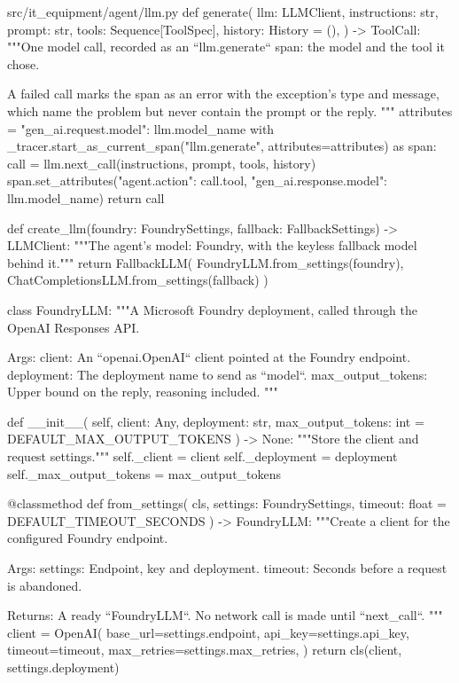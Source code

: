 \documentclass[11pt,letterpaper]{article}
\renewcommand{\_}{\textunderscore\allowbreak}
\begin{document}
\begin{codebox}{src/it_equipment/agent/llm.py}
def generate(
    llm: LLMClient,
    instructions: str,
    prompt: str,
    tools: Sequence[ToolSpec],
    history: History = (),
) -> ToolCall:
    """One model call, recorded as an ``llm.generate`` span: the model and the tool it chose.

    A failed call marks the span as an error with the exception's type and message, which
    name the problem but never contain the prompt or the reply.
    """
    attributes = {"gen_ai.request.model": llm.model_name}
    with _tracer.start_as_current_span("llm.generate", attributes=attributes) as span:
        call = llm.next_call(instructions, prompt, tools, history)
        span.set_attributes({"agent.action": call.tool, "gen_ai.response.model": llm.model_name})
        return call


def create_llm(foundry: FoundrySettings, fallback: FallbackSettings) -> LLMClient:
    """The agent's model: Foundry, with the keyless fallback model behind it."""
    return FallbackLLM(
        FoundryLLM.from_settings(foundry), ChatCompletionsLLM.from_settings(fallback)
    )


class FoundryLLM:
    """A Microsoft Foundry deployment, called through the OpenAI Responses API.

    Args:
        client: An ``openai.OpenAI`` client pointed at the Foundry endpoint.
        deployment: The deployment name to send as ``model``.
        max_output_tokens: Upper bound on the reply, reasoning included.
    """

    def __init__(
        self, client: Any, deployment: str, max_output_tokens: int = DEFAULT_MAX_OUTPUT_TOKENS
    ) -> None:
        """Store the client and request settings."""
        self._client = client
        self._deployment = deployment
        self._max_output_tokens = max_output_tokens

    @classmethod
    def from_settings(
        cls, settings: FoundrySettings, timeout: float = DEFAULT_TIMEOUT_SECONDS
    ) -> FoundryLLM:
        """Create a client for the configured Foundry endpoint.

        Args:
            settings: Endpoint, key and deployment.
            timeout: Seconds before a request is abandoned.

        Returns:
            A ready ``FoundryLLM``. No network call is made until ``next_call``.
        """
        client = OpenAI(
            base_url=settings.endpoint,
            api_key=settings.api_key,
            timeout=timeout,
            max_retries=settings.max_retries,
        )
        return cls(client, settings.deployment)


\end{codebox}
\end{document}
